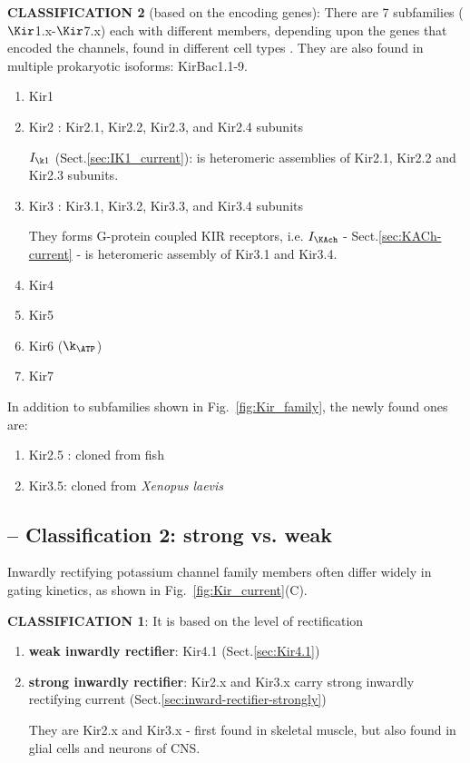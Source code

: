 {\bf CLASSIFICATION 2} (based on the encoding genes): There are 7 subfamilies
($\Kir$1.x-$\Kir$7.x) each with different members, depending upon the genes that
encoded the channels, found in different cell types \citep{kulbo2005}.
They are also found in multiple prokaryotic isoforms: KirBac1.1-9.

\begin{enumerate}
  \item Kir1
  
  \item Kir2 : Kir2.1, Kir2.2, Kir2.3, and Kir2.4 subunits
  
   $I_{\k 1}$ (Sect.\ref{sec:IK1_current}): is heteromeric assemblies of Kir2.1,
   Kir2.2 and Kir2.3 subunits.
  
  \item Kir3 : Kir3.1, Kir3.2, Kir3.3, and Kir3.4 subunits
  
 They forms G-protein coupled KIR receptors, i.e. $I_{\KAch}$ -
 Sect.\ref{sec:KACh-current} - is heteromeric assembly of Kir3.1 and Kir3.4.
  
  \item Kir4 
  
  \item Kir5
  
  \item Kir6 ($\k_\ATP$)
  
  \item Kir7
\end{enumerate}
In addition to subfamilies shown in Fig.~\ref{fig:Kir_family}, the newly found
ones are:
\begin{enumerate}
\item Kir2.5 : cloned from fish
\item Kir3.5: cloned from {\it Xenopus laevis}
\end{enumerate}



\subsection{-- Classification 2: strong vs. weak}
\label{sec:Kir-classification-signal-strength-based}

Inwardly rectifying potassium channel family members often differ widely in
gating kinetics, as shown in Fig.~\ref{fig:Kir_current}(C). 

{\bf CLASSIFICATION 1}: It is based on the level of rectification
\begin{enumerate}
  \item {\bf weak inwardly rectifier}: Kir4.1 (Sect.\ref{sec:Kir4.1})
      
  \item {\bf strong inwardly rectifier}: Kir2.x and Kir3.x carry strong inwardly
  rectifying current (Sect.\ref{sec:inward-rectifier-strongly}) 
  
They are  Kir2.x and Kir3.x - first found in skeletal muscle, but also found in
glial cells and neurons of CNS.
  
\end{enumerate}

